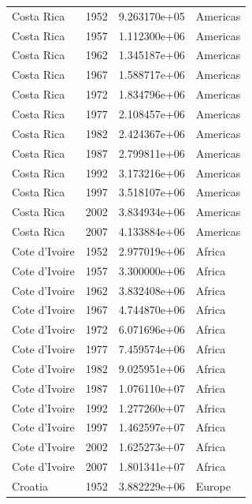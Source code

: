 \documentclass[
  letterpaper,
  DIV=11,
  numbers=noendperiod]{scrreprt}
\begin{document}
\begin{tcolorbox}
\begin{tabular}{lrrl}
Costa Rica               &  1952 &  9.263170e+05 &  Americas \\
Costa Rica               &  1957 &  1.112300e+06 &  Americas \\
Costa Rica               &  1962 &  1.345187e+06 &  Americas \\
Costa Rica               &  1967 &  1.588717e+06 &  Americas \\
Costa Rica               &  1972 &  1.834796e+06 &  Americas \\
Costa Rica               &  1977 &  2.108457e+06 &  Americas \\
Costa Rica               &  1982 &  2.424367e+06 &  Americas \\
Costa Rica               &  1987 &  2.799811e+06 &  Americas \\
Costa Rica               &  1992 &  3.173216e+06 &  Americas \\
Costa Rica               &  1997 &  3.518107e+06 &  Americas \\
Costa Rica               &  2002 &  3.834934e+06 &  Americas \\
Costa Rica               &  2007 &  4.133884e+06 &  Americas \\
Cote d'Ivoire            &  1952 &  2.977019e+06 &    Africa \\
Cote d'Ivoire            &  1957 &  3.300000e+06 &    Africa \\
Cote d'Ivoire            &  1962 &  3.832408e+06 &    Africa \\
Cote d'Ivoire            &  1967 &  4.744870e+06 &    Africa \\
Cote d'Ivoire            &  1972 &  6.071696e+06 &    Africa \\
Cote d'Ivoire            &  1977 &  7.459574e+06 &    Africa \\
Cote d'Ivoire            &  1982 &  9.025951e+06 &    Africa \\
Cote d'Ivoire            &  1987 &  1.076110e+07 &    Africa \\
Cote d'Ivoire            &  1992 &  1.277260e+07 &    Africa \\
Cote d'Ivoire            &  1997 &  1.462597e+07 &    Africa \\
Cote d'Ivoire            &  2002 &  1.625273e+07 &    Africa \\
Cote d'Ivoire            &  2007 &  1.801341e+07 &    Africa \\
Croatia                  &  1952 &  3.882229e+06 &    Europe \\

\end{tabular}
\end{tcolorbox}
\end{document}
